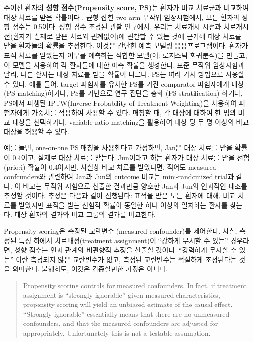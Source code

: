 \documentclass[]{book}
\begin{document}
주어진 환자의 \textbf{성향 점수(Propensity score, PS)}는 환자가 비교 치료군과 비교하여 대상 치료를 받을 확률이다 \citep{rosenbaum_1983}. 균형 잡힌 two-arm 무작위 임상시험에서, 모든 환자의 성향 점수는 0.5이다. 성향 점수 조정된 관찰 연구에서, 우리는 치료개시 시점과 치료개시 전(환자가 실제로 받은 치료와 관계없이)에 관찰할 수 있는 것에 근거해 대상 치료를 받을 환자들의 확률을 추정한다. 이것은 간단한 예측 모델링 응용프로그램이다. 환자가 표적 치료를 받았는지 여부를 예측하는 적합한 모델(예: 로지스틱 회귀분석)을 만들고, 이 모델을 사용하여 각 환자들에 대한 예측 확률을 생성한다. 표준 무작위 임상시험과 달리, 다른 환자는 대상 치료를 받을 확률이 다르다. PS는 여러 가지 방법으로 사용할 수 있다. 예를 들어, target 피험자를 유사한 PS를 가진 comparator 피험자에게 매칭 (PS matching)하거나, PS를 기반으로 연구 집단을 층화 (PS stratification) 하거나, PS에서 파생된 IPTW(Inverse Probability of Treatment Weighting)을 사용하여 피험자에게 가중치를 적용하여 사용할 수 있다. 매칭할 때, 각 대상에 대하여 한 명의 비교 대상을 선택하거나, variable-ratio matching을 활용하여 대상 당 두 명 이상의 비교 대상을 허용할 수 있다. \citep{rassen_2012}      

예를 들면, one-on-one PS 매칭을 사용한다고 가정하면, Jan은 대상 치료를 받을 확률이 0.4이고, 실제로 대상 치료를 받는다. Jun이라고 하는 환자가 대상 치료를 받을 선험(priori) 확률이 0.4이지만, 사실상 비교 치료를 받았다면, 적어도 measured confounders와 관련하여 Jan과 Jun의 outcome 비교는 mini-randomized trial과 같다. 이 비교는 무작위 시험으로 산출한 결과만큼 양호한 Jan과 Jun의 인과적인 대조를 추정할 것이다. 추정은 다음과 같이 진행된다: 표적을 받은 모든 환자에 대해, 비교 치료를 받았지만 표적을 받는 선험적 확률이 동일한 하나 이상의 일치하는 환자를 찾는다. 대상 환자의 결과와 비교 그룹의 결과를 비교한다.

Propensity scoring은 측정된 교란변수 (measured confounder)를 제어한다. 사실, 측정된 특성 하에서 치료배정(treatment assignment)이 ``강하게 무시할 수 있는'' 경우라면, 성향 점수는 인과 관계의 비편향적 추정을 산출할 것이다. ``강력하게 무시할 수 있는'' 이란 측정되지 않은 교란변수가 없고, 측정된 교란변수는 적절하게 조정된다는 것을 의미한다. 불행히도, 이것은 검증할만한 가정은 아니다. 

\begin{quote}
Propensity scoring controls for measured confounders. In fact, if treatment assignment is ``strongly ignorable'' given measured characteristics, propensity scoring will yield an unbiased estimate of the causal effect. ``Strongly ignorable'' essentially means that there are no unmeasured confounders, and that the measured confounders are adjusted for appropriately. Unfortunately this is not a testable assumption.
\end{quote}
\end{document}
